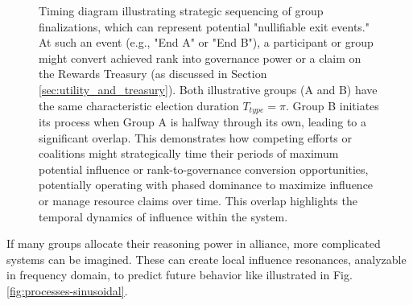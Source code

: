 \documentclass{article}
\begin{document}
\begin{CJK}{UTF8}{gbsn}
\begin{figure}[ht]
            \caption{Timing diagram illustrating strategic sequencing of group finalizations, which can represent potential "nullifiable exit events." At such an event (e.g., "End A" or "End B"), a participant or group might convert achieved rank into governance power or a claim on the Rewards Treasury (as discussed in Section \ref{sec:utility_and_treasury}). Both illustrative groups (A and B) have the same characteristic election duration $T_{type}=\pi$. Group B initiates its process when Group A is halfway through its own, leading to a significant overlap. This demonstrates how competing efforts or coalitions might strategically time their periods of maximum potential influence or rank-to-governance conversion opportunities, potentially operating with phased dominance to maximize influence or manage resource claims over time. This overlap highlights the temporal dynamics of influence within the system.}
            \label{fig:processes}
        \end{figure}

        If many groups allocate their reasoning power in alliance, more complicated systems can be imagined. These can create local influence resonances, analyzable in frequency domain, to predict future behavior like illustrated in Fig. \ref{fig:processes-sinusoidal}.

        \begin{figure}[ht]
            \centering
\end{figure}
\end{CJK}
\end{document}
